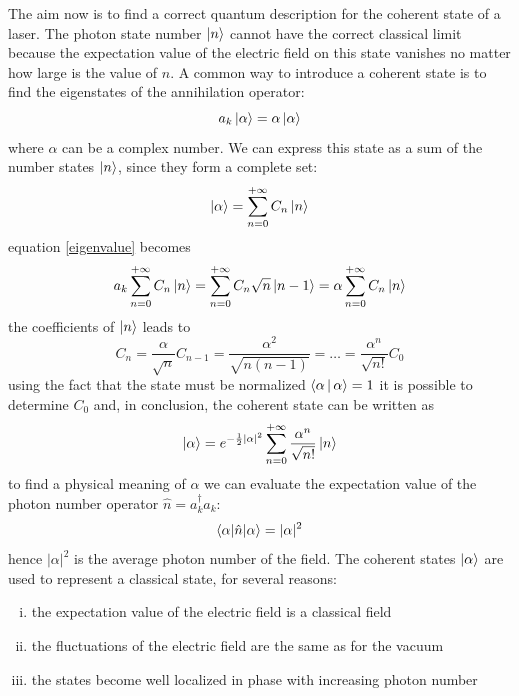 \documentclass[12pt]{book}
\begin{document}
The aim now is to find a correct quantum description for the coherent state of a laser. The photon state number $\Ket{n}$ cannot have the correct classical limit because the expectation value of the electric field on this state vanishes no matter how large is the value of $n$. A common way to introduce a coherent state is to find the eigenstates of the annihilation operator:
\begin{equation}\label{eigenvalue}
a_k\ket{\alpha} = \alpha \ket{\alpha}
\end{equation}
where $\alpha$ can be a complex number. We can express this state as a sum of the number states $\ket{n}$, since they form a complete set:
\begin{equation}\ket{\alpha} = \sum_{n=0}^{+\infty} C_n \ket{n}\end{equation}
equation \eqref{eigenvalue} becomes
\begin{equation}a_k\sum_{n=0}^{+\infty} C_n \ket{n} = \sum_{n=0}^{+\infty} C_n\sqrt{n}\ket{n-1} =\alpha\sum_{n=0}^{+\infty} C_n \ket{n}\end{equation}
the coefficients of $\ket{n}$ leads to
\begin{equation}C_n = \frac{\alpha}{\sqrt{n}}C_{n-1} = \frac{\alpha^2}{\sqrt{n(n-1)}} = \dots = \frac{\alpha^n}{\sqrt{n!}}C_0\end{equation}
using the fact that the state must be normalized $\Braket{\alpha|\alpha} = 1$ it is possible to determine $C_0$ and, in conclusion, the coherent state can be written as
\begin{equation}\label{coherentstate}
\ket{\alpha} = e^{-\frac{1}{2}|\alpha|^2}\sum_{n=0}^{+\infty} \frac{\alpha^n}{\sqrt{n!}}\ket{n}
\end{equation}
to find a physical meaning of $\alpha$ we can evaluate the expectation value of the photon number operator $\hat{n} = a_k^\dagger a_k$:
\begin{equation}\braket{\alpha|\hat{n}|\alpha} = |\alpha|^2 \end{equation}
hence $|\alpha|^2$ is the average photon number of the field. The coherent states $\ket{\alpha}$ are used to represent a classical state, for several reasons:
\begin{enumerate}[(i)]
\item the expectation value of the electric field is a classical field
\item the fluctuations of the electric field are the same as for the vacuum
\item the states become well localized in phase with increasing photon number
\end{enumerate}
\end{document}
